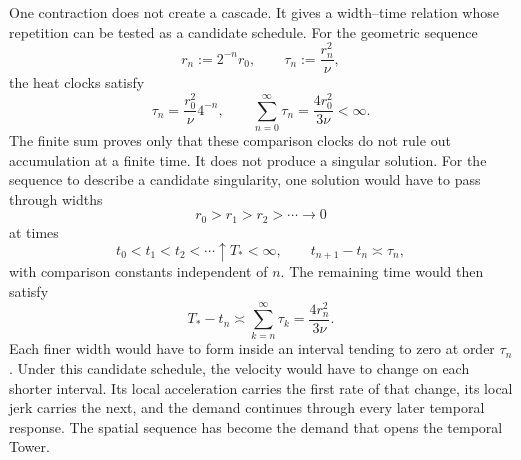 
One contraction does not create a cascade.
It gives a width--time relation whose repetition can be tested as a candidate schedule.
For the geometric sequence
\[
  r_n:=2^{-n}r_0,
  \qquad
  \tau_n:=\frac{r_n^2}{\nu},
\]
the heat clocks satisfy
\[
  \tau_n
  =
  \frac{r_0^2}{\nu}4^{-n},
  \qquad
  \sum_{n=0}^{\infty}\tau_n
  =
  \frac{4r_0^2}{3\nu}
  <
  \infty.
\]
The finite sum proves only that these comparison clocks do not rule out accumulation at a finite time.
It does not produce a singular solution.
For the sequence to describe a candidate singularity, one \NavierStokes{} solution would have to pass through widths
\[
  r_0>r_1>r_2>\cdots\longrightarrow0
\]
at times
\[
  t_0<t_1<t_2<\cdots\uparrow T_*<\infty,
  \qquad
  t_{n+1}-t_n\asymp\tau_n,
\]
with comparison constants independent of \(n\).
The remaining time would then satisfy
\[
  T_*-t_n
  \asymp
  \sum_{k=n}^{\infty}\tau_k
  =
  \frac{4r_n^2}{3\nu}.
\]
Each finer width would have to form inside an interval tending to zero at order \(\tau_n\).
Under this candidate schedule, the velocity would have to change on each shorter interval.
Its local acceleration carries the first rate of that change, its local jerk carries the next, and the demand continues through every later temporal response.
The spatial sequence has become the demand that opens the temporal Tower.
